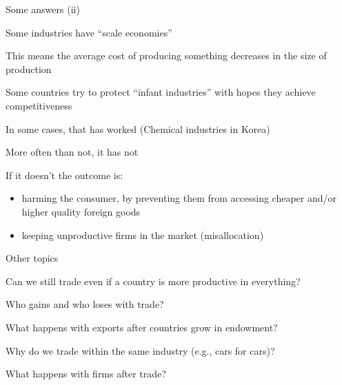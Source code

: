 \documentclass[notes,11pt, aspectratio=169, xcolor=table]{beamer}
\newenvironment{wideitemize}{\itemize\addtolength{\itemsep}{10pt}}{\enditemize}
\begin{document}
\begin{frame}{Some answers (ii)}

\begin{wideitemize}
    \item Some industries have ``scale economies''
    \item This means the average cost of producing something decreases in the size of production
    \item<2-> Some countries try to protect ``infant industries'' with hopes they achieve competitiveness 
    \item<3-> In some cases, that has worked (Chemical industries in Korea)
    \item<4-> More often than not, it has not
    \item<5-> If it doesn't the outcome is:
    \begin{itemize}
        \item harming the consumer, by preventing them from accessing cheaper and/or higher quality foreign goods
        \item keeping unproductive firms in the market (misallocation)
    \end{itemize}
    
\end{wideitemize}

    
\end{frame}



\begin{frame}{Other topics}

\begin{wideitemize}
    \item Can we still trade even if a country is more productive in everything?
    \item Who gains and who loses with trade?
    \item What happens with exports after countries grow in endowment?
    \item Why do we trade within the same industry (e.g., cars for cars)?
    \item What happens with firms after trade?
\end{wideitemize}

    
\end{frame}
\end{document}
